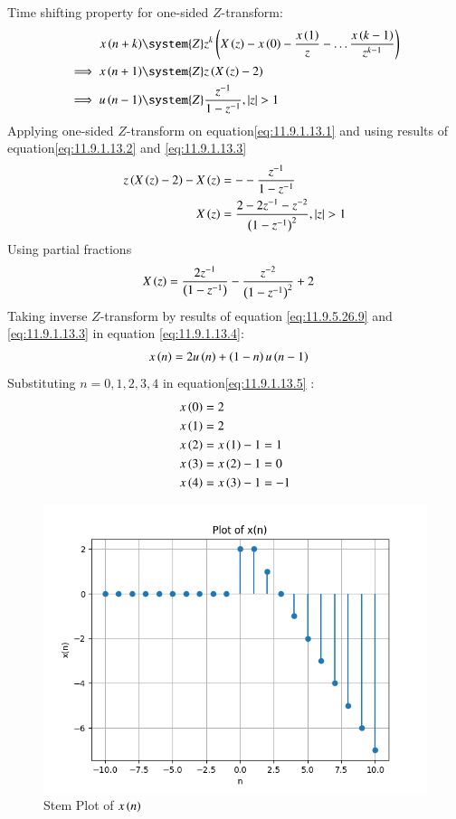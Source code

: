 \documentclass[journal,12pt,twocolumn]{IEEEtran}
\theoremstyle{remark}
\begin{document}
Time shifting property for one-sided $Z$-transform:
\begin{align}
x\brak{n+k}&\system{Z} z^{k}\brak{X\brak{z}-x\brak{0}-\frac{x\brak{1}}{z}-\ldots \frac{x\brak{k-1}}{z^{k-1}}}\label{eq:one-sided-shiftk}\\
\implies x\brak{n+1} &\system{Z} z\brak{X\brak{z}-2}\label{eq:11.9.1.13.2}\\
\implies u\brak{n-1} &\system{Z} \frac{z^{-1}}{1-z^{-1}},\abs{z}>1 \label{eq:11.9.1.13.3}
\end{align}
Applying one-sided $Z$-transform on equation\eqref{eq:11.9.1.13.1} and using results of equation\eqref{eq:11.9.1.13.2} and \eqref{eq:11.9.1.13.3}
\begin{align}
 z\left(X\left(z\right)-2\right) - X\left(z\right) &= --\frac{z^{-1}}{1-z^{-1}}\\
    X\left(z\right) &= \frac{2-2z^{-1}-z^{-2}}{\left(1-z^{-1}\right)^2}  ,   \left\vert z\right\vert >1
\end{align}
Using partial fractions
\begin{align}
    X\left(z\right) &= \frac{2z^{-1}}{\left(1-z^{-1}\right)} - \frac{z^{-2}}{\left(1-z^{-1}\right)^2} + 2\label{eq:11.9.1.13.4}
\end{align}
Taking inverse $Z$-transform by results of equation \eqref{eq:11.9.5.26.9} and \eqref{eq:11.9.1.13.3} in equation \eqref{eq:11.9.1.13.4}:
\begin{align}
    x\left(n\right) &= 2u\left(n\right)+\left(1-n\right)u\left(n-1\right)\label{eq:11.9.1.13.5}
\end{align}
Substituting $n=0,1,2,3,4$ in equation\eqref{eq:11.9.1.13.5} :
\begin{align}
    x\left(0\right) &= 2\\
    x\left(1\right) &= 2\\
    x\left(2\right) &= x\left(1\right) - 1 = 1  \\
    x\left(3\right) &= x\left(2\right) - 1 = 0\\
    x\left(4\right) &= x\left(3\right) - 1 = -1 
\end{align}
\begin{figure}[H]                                                                                 \centering
\includegraphics[width=1\columnwidth]{figs/fig_x(n).png}
\caption{Stem Plot of $x\left(n\right)$}
\label{fig:x(n)} 
\end{figure}
\end{document}
